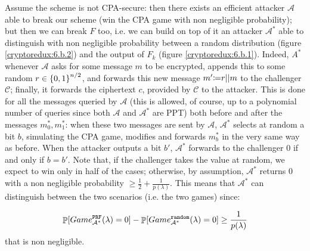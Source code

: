 \begin{enumerate}[(a)]
\begin{solution}
		Assume the scheme is not CPA-secure: then there exists an efficient attacker $\mathcal{A}$ able to break our scheme (win the CPA game with non negligible probability); but then we can break $F$ too, i.e. we can build on top of it an attacker $\mathcal{A}^*$ able to distinguish with non negligible probability between a random distribution (figure \ref{cryptoredux:6.b.2}) and the output of $F_k$ (figure \ref{cryptoredux:6.b.1}). Indeed, $A^*$ whenever $\mathcal{A}$ asks for some message $m$ to be encrypted, appends this to some random $r \in \bits^{n/2}$, and forwards this new message $m'\deq r||m$ to the challenger $\mathcal{C}$; finally, it forwards the ciphertext $c$, provided by $\mathcal{C}$ to the attacker. This is done for all the messages queried by $\mathcal{A}$ (this is allowed, of course, up to a polynomial number of queries since both $\mathcal{A}$ and $\mathcal{A}^*$ are PPT) both before and after the messages $m_0^*, m_1^*$: when these two messages are sent by $\mathcal{A}$, $\mathcal{A}^*$ selects at random a bit $b$, simulating the CPA game, modifies and forwards $m_b^*$ in the very same way as before. When the attacker outputs a bit $b'$, $\mathcal{A}^*$ forwards to the challenger 0 if and only if $b = b'$. Note that, if the challenger takes the value at random, we expect to win only in half of the cases; otherwise, by assumption, $\mathcal{A}^*$ returns 0 with a non negligible probability $\ge \frac{1}{2} + \frac{1}{p(\lambda)}$. This means that $\mathcal{A}^*$ can distinguish between the two scenarios (i.e. the two games) since:
		
		\[\P[Game_{\mathcal{A}^*}^{\texttt{PRF}}(\lambda) = 0] - \P[Game_{\mathcal{A}^*}^{\texttt{random}}(\lambda) = 0] \ge \frac{1}{p(\lambda)}\]
		that is non negligible.
	\end{solution}	
\end{enumerate}